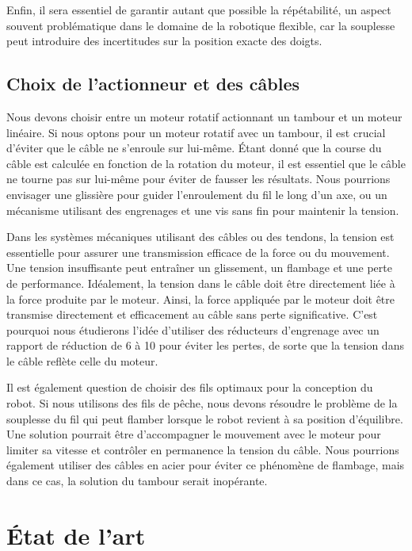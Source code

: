 \documentclass[a4paper, 11pt]{report}
\begin{document}
        Enfin, il sera essentiel de garantir autant que possible la répétabilité, un aspect souvent problématique dans le domaine de la robotique flexible, car la souplesse peut introduire des incertitudes sur la position exacte des doigts.

    \subsection{Choix de l'actionneur et des câbles}

        Nous devons choisir entre un moteur rotatif actionnant un tambour et un moteur linéaire. Si nous optons pour un moteur rotatif avec un tambour, il est crucial d'éviter que le câble ne s'enroule sur lui-même. Étant donné que la course du câble est calculée en fonction de la rotation du moteur, il est essentiel que le câble ne tourne pas sur lui-même pour éviter de fausser les résultats. Nous pourrions envisager une glissière pour guider l'enroulement du fil le long d'un axe, ou un mécanisme utilisant des engrenages et une vis sans fin pour maintenir la tension.

        Dans les systèmes mécaniques utilisant des câbles ou des tendons, la tension est essentielle pour assurer une transmission efficace de la force ou du mouvement. Une tension insuffisante peut entraîner un glissement, un flambage et une perte de performance. Idéalement, la tension dans le câble doit être directement liée à la force produite par le moteur. Ainsi, la force appliquée par le moteur doit être transmise directement et efficacement au câble sans perte significative. C'est pourquoi nous étudierons l'idée d'utiliser des réducteurs d'engrenage avec un rapport de réduction de 6 à 10 pour éviter les pertes, de sorte que la tension dans le câble reflète celle du moteur.

        Il est également question de choisir des fils optimaux pour la conception du robot. Si nous utilisons des fils de pêche, nous devons résoudre le problème de la souplesse du fil qui peut flamber lorsque le robot revient à sa position d'équilibre. Une solution pourrait être d'accompagner le mouvement avec le moteur pour limiter sa vitesse et contrôler en permanence la tension du câble. Nous pourrions également utiliser des câbles en acier pour éviter ce phénomène de flambage, mais dans ce cas, la solution du tambour serait inopérante.
        
\clearpage

\section{État de l'art}
\end{document}

